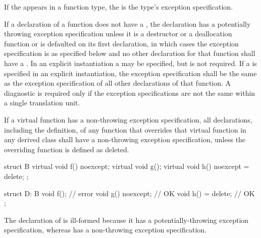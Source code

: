 \pnum
If the  appears in a function type,
the  is the type's exception specification.

\pnum
If a declaration of a function
does not have a ,
the declaration has a potentially throwing exception specification
unless it is a destructor or a deallocation function
or is defaulted on its first declaration,
in which cases the exception specification
is as specified below
and no other declaration for that function
shall have a .
In an explicit instantiation
a  may be specified,
but is not required.
If a  is specified
in an explicit instantiation,
the exception specification shall be the same as
the exception specification of all other declarations of that function.
A diagnostic is required only if the
exception specifications are not the same
within a single translation unit.

\pnum
{}%
If a virtual function has a
non-throwing exception specification,
all declarations, including the definition, of any function
that overrides that virtual function in any derived class
shall have a non-throwing
exception specification,
unless the overriding function is defined as deleted.
\begin{example}
\begin{codeblock}
struct B {
  virtual void f() noexcept;
  virtual void g();
  virtual void h() noexcept = delete;
};

struct D: B {
  void f();                     // error
  void g() noexcept;            // OK
  void h() = delete;            // OK
};
\end{codeblock}

The declaration of
is ill-formed because it
has a potentially-throwing exception specification,
whereas
has a non-throwing exception specification.
\end{example}

